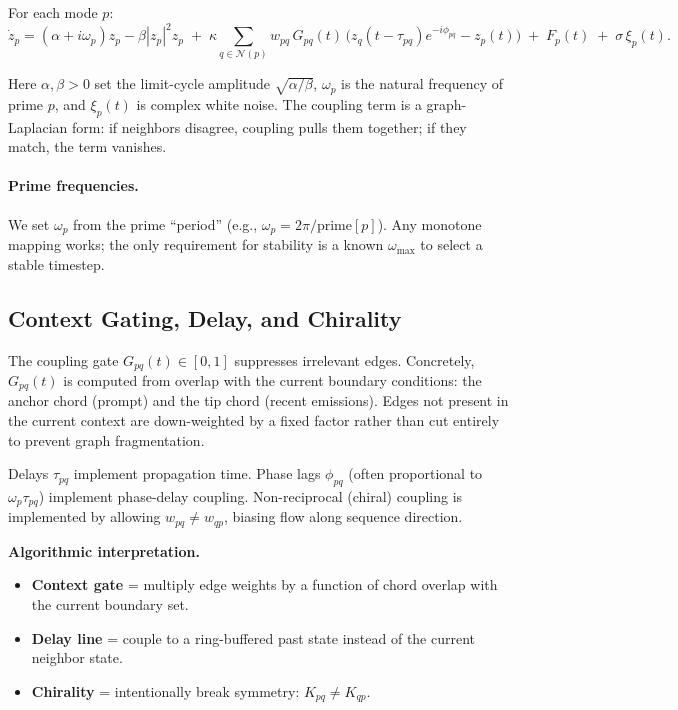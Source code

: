 \documentclass[11pt,a4paper]{article}
\newcommand{\z}{z}                %
\newcommand{\force}{F}
\newcommand{\coupling}{\kappa}
\newcommand{\noise}{\sigma}
\begin{document}
For each mode $p$:
\begin{equation}
\dot{\z}_p = (\alpha + i\omega_p)\z_p - \beta |\z_p|^2 \z_p \;+\; \coupling \sum_{q\in \mathcal{N}(p)} w_{pq}\,G_{pq}(t)\,\bigl(\z_q(t-\tau_{pq})e^{-i\phi_{pq}}-\z_p(t)\bigr)\;+\;\force_p(t)\;+\;\noise\,\xi_p(t).
\label{eq:hopf}
\end{equation}

Here $\alpha,\beta>0$ set the limit-cycle amplitude $\sqrt{\alpha/\beta}$, $\omega_p$ is the natural frequency of prime $p$, and $\xi_p(t)$ is complex white noise. The coupling term is a graph-Laplacian form: if neighbors disagree, coupling pulls them together; if they match, the term vanishes.

\paragraph{Prime frequencies.}
We set $\omega_p$ from the prime ``period'' (e.g., $\omega_p = 2\pi / \text{prime}[p]$). Any monotone mapping works; the only requirement for stability is a known $\omega_{\max}$ to select a stable timestep.

\subsection{Context Gating, Delay, and Chirality}
\label{subsec:gating_delay}
\label{eq:alignment_amplitude}%

The coupling gate $G_{pq}(t)\in[0,1]$ suppresses irrelevant edges. Concretely, $G_{pq}(t)$ is computed from overlap with the current boundary conditions: the anchor chord (prompt) and the tip chord (recent emissions). Edges not present in the current context are down-weighted by a fixed factor rather than cut entirely to prevent graph fragmentation.

Delays $\tau_{pq}$ implement propagation time. Phase lags $\phi_{pq}$ (often proportional to $\omega_p\tau_{pq}$) implement phase-delay coupling. Non-reciprocal (chiral) coupling is implemented by allowing $w_{pq}\neq w_{qp}$, biasing flow along sequence direction.

\begin{algobox}
\textbf{Algorithmic interpretation.}
\begin{itemize}[nosep]
  \item \textbf{Context gate} = multiply edge weights by a function of chord overlap with the current boundary set.
  \item \textbf{Delay line} = couple to a ring-buffered past state instead of the current neighbor state.
  \item \textbf{Chirality} = intentionally break symmetry: $K_{pq}\neq K_{qp}$.
\end{itemize}
\end{algobox}
\end{document}

